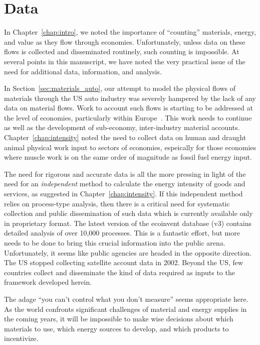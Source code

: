 \section{Data}
\label{sec:Data}

In Chapter~\ref{chap:intro}, 
we noted the importance of ``counting''
materials, energy, and value as they flow through economies.  
Unfortunately, unless data on these flows 
is collected and disseminated routinely, 
such counting is impossible.
At several points in this manuscript,
we have noted the very practical issue of the
need for additional data, information, and analysis.

In Section~\ref{sec:materials_auto},
our attempt to model the physical flows of 
materials through the US auto industry was
severely hampered by the lack of any data on
material flows.
Work to account such flows is starting to be
addressed at the level of economies,
particularly within Europe~\cite{EUROSTAT2011}.
This work needs to continue as well as the
development of sub-economy,
inter-industry material accounts.
Chapter~\ref{chap:intensity} noted the need to collect
data on human and draught animal physical work input to 
sectors of economies, espeically for those economies where 
muscle work is on the same order of magnitude 
as fossil fuel energy input.

The need for rigorous and accurate data
is all the more pressing in light of the need for
an \emph{independent} method to calculate
the energy intensity of goods and services,
as suggested in Chapter~\ref{chap:intensity}.
If this independent method relies on process-type
analysis,
then there is a critical need for systematic
collection and public dissemination of such data
which is currently available only in proprietary format.
The latest version of the ecoinvent database (v3)
contains detailed analysis of over 10,000 
processes.\cite{EcoInvent2012}
This is a fantastic effort, but more needs to be
done to bring this crucial information into the public arena.
Unfortunately, it seems like public agencies are headed in the
opposite direction.
The US stopped collecting 
satellite account data in 2002. 
Beyond the US, few countries collect and disseminate
the kind of data required as inputs to the framework
developed herein.

The adage ``you can't control what you don't measure''
seems appropriate here. 
As the world confronts significant challenges
of material and energy supplies in the coming years,
it will be impossible to make wise decisions about
which materials to use,
which energy sources to develop, and 
which products to incentivize.

